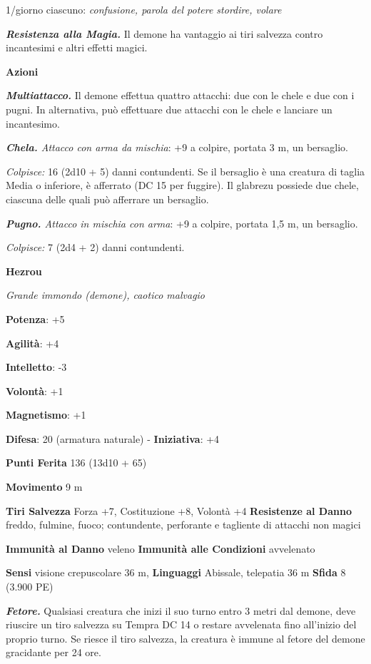 \begin{multicols}{2}
1/giorno ciascuno: \emph{confusione, parola del potere stordire, volare}

\emph{\textbf{Resistenza alla Magia.}} Il demone ha vantaggio ai tiri
salvezza contro incantesimi e altri effetti magici.

\textbf{Azioni}

\emph{\textbf{Multiattacco.}} Il demone effettua quattro attacchi: due
con le chele e due con i pugni. In alternativa, può effettuare due
attacchi con le chele e lanciare un incantesimo.

\emph{\textbf{Chela.} Attacco con arma da mischia}: +9 a colpire,
portata 3 m, un bersaglio.

\emph{Colpisce:} 16 (2d10 + 5) danni contundenti. Se il bersaglio è una
creatura di taglia Media o inferiore, è afferrato (DC 15 per fuggire).
Il glabrezu possiede due chele, ciascuna delle quali può afferrare un
bersaglio.

\emph{\textbf{Pugno.} Attacco in mischia con arma}: +9 a colpire,
portata 1,5 m, un bersaglio.

\emph{Colpisce:} 7 (2d4 + 2) danni contundenti.

\textbf{Hezrou}

\emph{Grande immondo (demone), caotico malvagio}

\textbf{Potenza}: +5

\textbf{Agilità}: +4

\textbf{Intelletto}: -3

\textbf{Volontà}: +1

\textbf{Magnetismo}: +1

\textbf{Difesa}: 20 (armatura naturale) - \textbf{Iniziativa}: +4

\textbf{Punti Ferita} 136 (13d10 + 65)

\textbf{Movimento} 9 m

\textbf{Tiri Salvezza} Forza +7, Costituzione +8, Volontà +4
\textbf{Resistenze al Danno} freddo, fulmine, fuoco; contundente,
perforante e tagliente di attacchi non magici

\textbf{Immunità al Danno} veleno \textbf{Immunità alle Condizioni}
avvelenato

\textbf{Sensi} visione crepuscolare 36 m, 
\textbf{Linguaggi} Abissale, telepatia 36 m \textbf{Sfida} 8 (3.900 PE)

\emph{\textbf{Fetore.}} Qualsiasi creatura che inizi il suo turno entro
3 metri dal demone, deve riuscire un tiro salvezza su Tempra DC 14
o restare avvelenata fino all'inizio del proprio turno. Se riesce il
tiro salvezza, la creatura è immune al fetore del demone gracidante per
24 ore.


\end{multicols}
